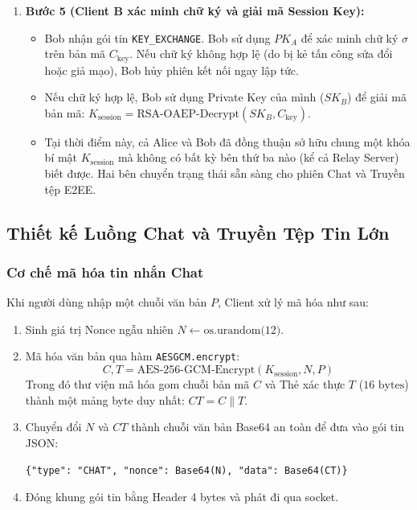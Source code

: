 \documentclass[a4paper,12pt]{article}
\begin{document}
\begin{enumerate}
\begin{itemize}
\hspace*{1em}$C_{\text{key}} = \text{RSA-OAEP-Encrypt}(PK_B, K_{\text{session}})$.
        \item Alice ký số lên chính bản mã $C_{\text{key}}$ bằng Private Key của mình ($SK_A$) qua chuẩn RSA-PSS: $\sigma = \text{RSA-PSS-Sign}(SK_A, C_{\text{key}})$.
        \item Alice gửi gói tin \texttt{KEY\_EXCHANGE} chứa $C_{\text{key}}$, chữ ký số $\sigma$ và Public Key của Alice ($PK_A$) sang cho Bob.
    \end{itemize}
    \item \textbf{Bước 5 (Client B xác minh chữ ký và giải mã Session Key):}
    \begin{itemize}
        \item Bob nhận gói tin \texttt{KEY\_EXCHANGE}. Bob sử dụng $PK_A$ để xác minh chữ ký $\sigma$ trên bản mã $C_{\text{key}}$. Nếu chữ ký không hợp lệ (do bị kẻ tấn công sửa đổi hoặc giả mạo), Bob hủy phiên kết nối ngay lập tức.
        \item Nếu chữ ký hợp lệ, Bob sử dụng Private Key của mình ($SK_B$) để giải mã bản mã: $K_{\text{session}} = \text{RSA-OAEP-Decrypt}(SK_B, C_{\text{key}})$.
        \item Tại thời điểm này, cả Alice và Bob đã đồng thuận sở hữu chung một khóa bí mật $K_{\text{session}}$ mà không có bất kỳ bên thứ ba nào (kể cả Relay Server) biết được. Hai bên chuyển trạng thái sẵn sàng cho phiên Chat và Truyền tệp E2EE.
    \end{itemize}
\end{enumerate}

\subsection{Thiết kế Luồng Chat và Truyền Tệp Tin Lớn}

\subsubsection{Cơ chế mã hóa tin nhắn Chat}
Khi người dùng nhập một chuỗi văn bản $P$, Client xử lý mã hóa như sau:
\begin{enumerate}
    \item Sinh giá trị Nonce ngẫu nhiên $N \leftarrow \text{os.urandom(12)}$.
    \item Mã hóa văn bản qua hàm \texttt{AESGCM.encrypt}:
    \begin{equation}
        C, T = \text{AES-256-GCM-Encrypt}(K_{\text{session}}, N, P)
    \end{equation}
    Trong đó thư viện mã hóa gom chuỗi bản mã $C$ và Thẻ xác thực $T$ ($16\text{ bytes}$) thành một mảng byte duy nhất: $CT = C \parallel T$.
    \item Chuyển đổi $N$ và $CT$ thành chuỗi văn bản Base64 an toàn để đưa vào gói tin JSON:
    \begin{center}
    \texttt{\{"type": "CHAT", "nonce": Base64(N), "data": Base64(CT)\}}
    \end{center}
    \item Đóng khung gói tin bằng Header 4 bytes và phát đi qua socket.
\end{enumerate}
\end{document}
